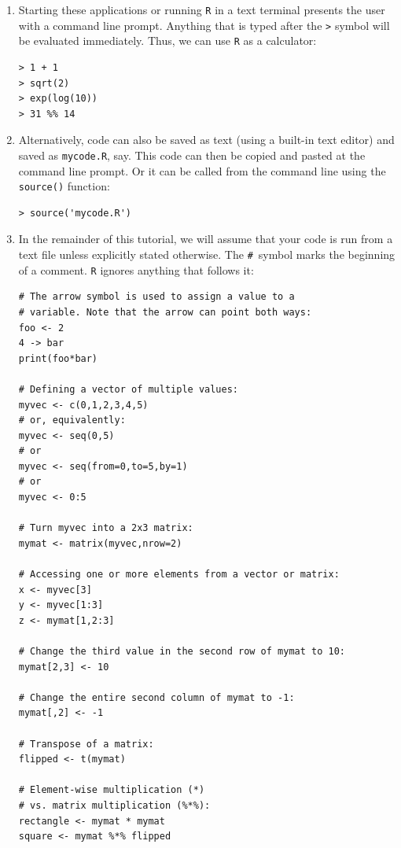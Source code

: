 \documentclass{book}
\begin{document}
\begin{enumerate}
  \item Starting these applications or running \texttt{R} in a text
    terminal presents the user with a command line prompt. Anything
    that is typed after the \texttt{>} symbol will be evaluated
    immediately. Thus, we can use \texttt{R} as a calculator:

\begin{verbatim}
> 1 + 1
> sqrt(2)
> exp(log(10))
> 31 %% 14
\end{verbatim}

\item Alternatively, code can also be saved as text (using a built-in text
  editor) and saved as \texttt{mycode.R}, say. This code can then be
  copied and pasted at the command line prompt. Or it can be called from
  the command line using the \texttt{source()} function:

\begin{verbatim}
> source('mycode.R')
\end{verbatim}

\item In the remainder of this tutorial, we will assume that your code is
  run from a text file unless explicitly stated otherwise. The
  \texttt{\#}~symbol marks the beginning of a comment.  \texttt{R}
  ignores anything that follows it:

\begin{verbatim}
# The arrow symbol is used to assign a value to a
# variable. Note that the arrow can point both ways:
foo <- 2
4 -> bar
print(foo*bar)

# Defining a vector of multiple values:
myvec <- c(0,1,2,3,4,5)
# or, equivalently:
myvec <- seq(0,5)
# or
myvec <- seq(from=0,to=5,by=1)
# or
myvec <- 0:5

# Turn myvec into a 2x3 matrix:
mymat <- matrix(myvec,nrow=2)

# Accessing one or more elements from a vector or matrix:
x <- myvec[3]
y <- myvec[1:3]
z <- mymat[1,2:3]

# Change the third value in the second row of mymat to 10:
mymat[2,3] <- 10

# Change the entire second column of mymat to -1:
mymat[,2] <- -1

# Transpose of a matrix:
flipped <- t(mymat)

# Element-wise multiplication (*) 
# vs. matrix multiplication (%*%):
rectangle <- mymat * mymat
square <- mymat %*% flipped
\end{verbatim}


\end{enumerate}
\end{document}
